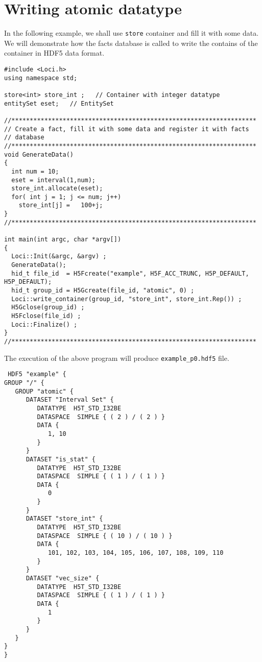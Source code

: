 \section { Writing atomic datatype }
In the following example, we shall use {\tt store} container and fill it with
some data. We will demonstrate how the facts database is called to write the
contains of the container in HDF5 data format.
\begin{verbatim}
#include <Loci.h>
using namespace std;

store<int> store_int ;   // Container with integer datatype
entitySet eset;   // EntitySet

//*******************************************************************
// Create a fact, fill it with some data and register it with facts
// database
//*******************************************************************
void GenerateData()
{
  int num = 10;
  eset = interval(1,num);
  store_int.allocate(eset);
  for( int j = 1; j <= num; j++) 
    store_int[j] =   100+j;
}
//*******************************************************************

int main(int argc, char *argv[])
{
  Loci::Init(&argc, &argv) ;
  GenerateData();
  hid_t file_id  = H5Fcreate("example", H5F_ACC_TRUNC, H5P_DEFAULT, H5P_DEFAULT);
  hid_t group_id = H5Gcreate(file_id, "atomic", 0) ;
  Loci::write_container(group_id, "store_int", store_int.Rep()) ; 
  H5Gclose(group_id) ;
  H5Fclose(file_id) ;
  Loci::Finalize() ;
}
//*******************************************************************
\end{verbatim}
The execution of the above program will produce {\tt example\_p0.hdf5} file. 
\begin{verbatim}
 HDF5 "example" {
GROUP "/" {
   GROUP "atomic" {
      DATASET "Interval Set" {
         DATATYPE  H5T_STD_I32BE  
         DATASPACE  SIMPLE { ( 2 ) / ( 2 ) } 
         DATA {
            1, 10
         } 
      } 
      DATASET "is_stat" {
         DATATYPE  H5T_STD_I32BE  
         DATASPACE  SIMPLE { ( 1 ) / ( 1 ) } 
         DATA {
            0
         } 
      } 
      DATASET "store_int" {
         DATATYPE  H5T_STD_I32BE  
         DATASPACE  SIMPLE { ( 10 ) / ( 10 ) } 
         DATA {
            101, 102, 103, 104, 105, 106, 107, 108, 109, 110
         } 
      } 
      DATASET "vec_size" {
         DATATYPE  H5T_STD_I32BE  
         DATASPACE  SIMPLE { ( 1 ) / ( 1 ) } 
         DATA {
            1
         } 
      } 
   } 
} 
} 

\end{verbatim}
